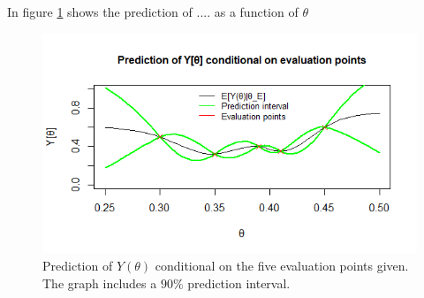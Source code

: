 In figure \ref{2afiveeval} shows the prediction of .... as a function of $\theta$ 

\begin{figure}
    \centering
    \includegraphics[width=130mm]{2aeval.png}
    \caption{Prediction of $Y(\theta)$ conditional on the five evaluation points given. The graph includes a $90\%$ prediction interval. }
    \label{2afiveeval}
\end{figure}
